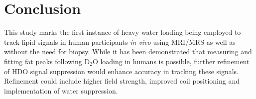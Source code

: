 \documentclass[class=article, crop=false]{standalone}
\begin{document}
\section{Conclusion}

This study marks the first instance of heavy water loading being employed to track lipid signals in human participants \textit{in vivo} using MRI/MRS as well as without the need for biopsy. While it has been demonstrated that measuring and fitting fat peaks following D$_2$O loading in humans is possible, further refinement of HDO signal suppression would enhance accuracy in tracking these signals. Refinement could include higher field strength, improved coil positioning and implementation of water suppression. 


\printbibliography %
\end{document}
